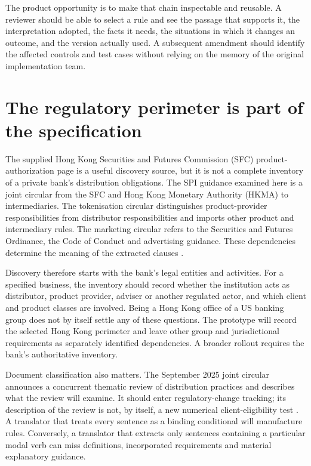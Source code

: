 \documentclass[12pt,a4paper,oneside,openany]{book}
\begin{document}
The product opportunity is to make that chain inspectable and reusable. A
reviewer should be able to select a rule and see the passage that supports it,
the interpretation adopted, the facts it needs, the situations in which it changes
an outcome, and the version actually used. A subsequent amendment should identify
the affected controls and test cases without relying on the memory of the
original implementation team.

\section{The regulatory perimeter is part of the specification}
\label{merge:P-01-problem:01}


The supplied Hong Kong Securities and Futures Commission (SFC) product-authorization
page is a useful discovery source, but it
is not a complete inventory of a private bank's distribution obligations. The
SPI guidance examined here is a joint circular from the SFC and Hong Kong Monetary
Authority (HKMA) to intermediaries. The
tokenisation circular distinguishes product-provider responsibilities from
distributor responsibilities and imports other product and intermediary rules.
The marketing circular refers to the Securities and Futures Ordinance, the Code
of Conduct and advertising guidance. These dependencies determine the meaning of
the extracted clauses \citep{sfcindex,sfcspi,sfctoken2026,sfcmarketing}.

Discovery therefore starts with the bank's legal entities and activities. For a
specified business, the inventory should record whether the institution acts as
distributor, product provider, adviser or another regulated actor, and which
client and product classes are involved. Being a Hong Kong office of a US banking
group does not by itself settle any of these questions. The prototype will record
the selected Hong Kong perimeter and leave other group and jurisdictional
requirements as separately identified dependencies. A broader rollout requires
the bank's authoritative inventory.

Document classification also matters. The September 2025 joint circular announces
a concurrent thematic review of distribution practices and describes what the
review will examine. It should enter regulatory-change tracking; its description
of the review is not, by itself, a new numerical client-eligibility test
\citep{sfcreview2025}. A translator that treats every sentence as a binding
conditional will manufacture rules. Conversely, a translator that extracts only
sentences containing a particular modal verb can miss definitions, incorporated
requirements and material explanatory guidance.
\end{document}
